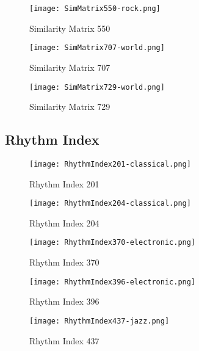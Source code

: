 \documentclass{article} %
\begin{document}
\begin{figure}[H]
\centering
\texttt{[image: SimMatrix550-rock.png]}
\caption{Similarity Matrix 550}
\label{fig:sim550_1}
\end{figure}

\begin{figure}[H]
\centering
\texttt{[image: SimMatrix707-world.png]}
\caption{Similarity Matrix 707}
\label{fig:sim707_1}
\end{figure}

\begin{figure}[H]
\centering
\texttt{[image: SimMatrix729-world.png]}
\caption{Similarity Matrix 729}
\label{fig:sim729_1}
\end{figure}






\subsection{Rhythm Index}
\label{sec:rhythmFig}


\begin{figure}[H]
\centering
\texttt{[image: RhythmIndex201-classical.png]}
\caption{Rhythm Index 201}
\label{fig:rhy201_1}
\end{figure}

\begin{figure}[H]
\centering
\texttt{[image: RhythmIndex204-classical.png]}
\caption{Rhythm Index 204}
\label{fig:rhy204_1}
\end{figure}


\begin{figure}[H]
\centering
\texttt{[image: RhythmIndex370-electronic.png]}
\caption{Rhythm Index 370}
\label{fig:rhy370_1}
\end{figure}

\begin{figure}[H]
\centering
\texttt{[image: RhythmIndex396-electronic.png]}
\caption{Rhythm Index 396}
\label{fig:rhy396_1}
\end{figure}

\begin{figure}[H]
\centering
\texttt{[image: RhythmIndex437-jazz.png]}
\caption{Rhythm Index 437}
\label{fig:rhy437_1}
\end{figure}
\end{document}
